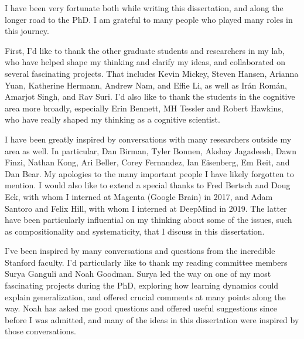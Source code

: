 \documentclass{report}
\begin{document}

I have been very fortunate both while writing this dissertation, and along the longer road to the PhD. I am grateful to many people who played many roles in this journey.

First, I'd like to thank the other graduate students and researchers in my lab, who have helped shape my thinking and clarify my ideas, and collaborated on several fascinating projects. That includes Kevin Mickey, Steven Hansen, Arianna Yuan, Katherine Hermann, Andrew Nam, and Effie Li, as well as Ir\'an Rom\'an, Amarjot Singh, and Rav Suri. I'd also like to thank the students in the cognitive area more broadly, especially Erin Bennett, MH Tessler and Robert Hawkins, who have really shaped my thinking as a cognitive scientist. 

I have been greatly inspired by conversations with many researchers outside my area as well. In particular, Dan Birman, Tyler Bonnen, Akshay Jagadeesh, Dawn Finzi, Nathan Kong, Ari Beller, Corey Fernandez, Ian Eisenberg, Em Reit, and Dan Bear. My apologies to the many important people I have likely forgotten to mention. I would also like to extend a special thanks to Fred Bertsch and Doug Eck, with whom I interned at Magenta (Google Brain) in 2017, and Adam Santoro and Felix Hill, with whom I interned at DeepMind in 2019. The latter have been particularly influential on my thinking about some of the issues, such as compositionality and systematicity, that I discuss in this dissertation. 


I've been inspired by many conversations and questions from the incredible Stanford faculty. I'd particularly like to thank my reading committee members Surya Ganguli and Noah Goodman. Surya led the way on one of my most fascinating projects during the PhD, exploring how learning dynamics could explain generalization, and offered crucial comments at many points along the way. Noah has asked me good questions and offered useful suggestions since before I was admitted, and many of the ideas in this dissertation were inspired by those conversations. 
\end{document}
